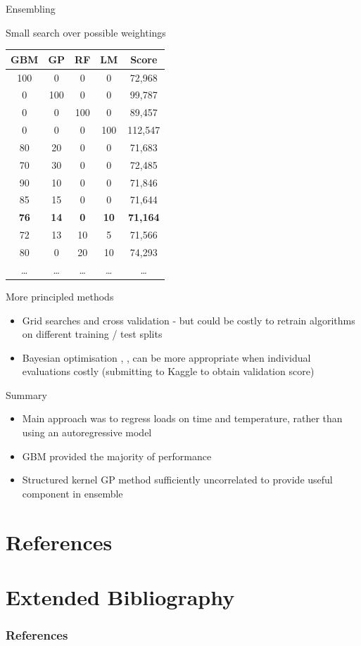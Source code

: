 \begin{frame}{Ensembling}
  \begin{block}{Small search over possible weightings}
    \begin{center}
      \scriptsize
      \begin{tabular}{cccc|c}
        GBM & GP & RF & LM & Score \\
        \hline
        100 & 0 & 0 & 0 & 72,968 \\
        0 & 100 & 0 & 0 & 99,787 \\
        0 & 0 & 100 & 0 & 89,457 \\
        0 & 0 & 0 & 100 & 112,547 \\
        80 & 20 & 0 & 0 & 71,683 \\
        70 & 30 & 0 & 0 & 72,485 \\
        90 & 10 & 0 & 0 & 71,846 \\
        85 & 15 & 0 & 0 & 71,644 \\
        \bf{76} & \bf{14} & \bf{0} & \bf{10} & \bf{71,164} \\
        72 & 13 & 10 & 5 & 71,566 \\
        80 & 0 & 20 & 10 & 74,293 \\
        \ldots & \ldots & \ldots & \ldots & \ldots
      \end{tabular}
    \end{center}
  \end{block}
  \begin{block}{More principled methods}
    \begin{itemize}
      \item Grid searches and cross validation - but could be costly to retrain algorithms on different training / test splits
      \item Bayesian optimisation \cite{Osborne2009}, \cite{snoek2012practical}, \cite{HennigSchuler2012} can be more appropriate when individual evaluations costly (\eg submitting to Kaggle to obtain validation score)
    \end{itemize}
  \end{block}
\end{frame}

\begin{frame}{Summary}
  \begin{itemize}
    \item Main approach was to regress loads on time and temperature, rather than using an autoregressive model
    \vspace{2\baselineskip}
    \item GBM provided the majority of performance
    \vspace{2\baselineskip}
    \item Structured kernel GP method sufficiently uncorrelated to provide useful component in ensemble
  \end{itemize}
\end{frame}

{
\section{References}
\section{Extended Bibliography}
\tiny
\begin{frame}
  \frametitle{References}
  
  
\end{frame}
}


